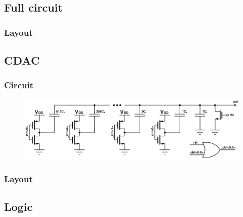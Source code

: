 		\subsection{Full circuit}
		\subsubsection{Layout}
	\FloatBarrier
	\subsection{CDAC}
		\subsubsection{Circuit}
			\begin{figure}[htb!]
			        \centering
			        \includegraphics[width=\textwidth, angle=0]{./figs/cdac_10b}
			\end{figure}
		\subsubsection{Layout}





	\FloatBarrier
	\subsection{Logic}






